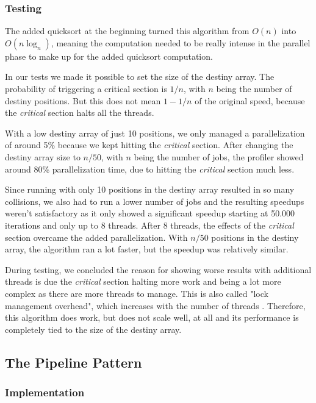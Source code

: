 \documentclass[9pt,journal]{IEEEtran}
\begin{document}
\subsubsection{Testing}

The added quicksort at the beginning turned this algorithm from $ O(n) $ into $ O(n\log_n) $, meaning the computation needed to be really intense in the parallel phase to make up for the added quicksort computation. 

In our tests we made it possible to set the size of the destiny array. The probability of triggering a critical section is $ 1 / n $, with $ n $ being the number of destiny positions. But this does not mean $ 1 - 1 / n $ of the original speed, because the \textit{critical} section halts all the threads. 

With a low destiny array of just 10 positions, we only managed a parallelization of around 5\% because we kept hitting the \textit{critical} section. After changing the destiny array size to $ n / 50 $, with $ n $ being the number of jobs, the profiler showed around 80\% parallelization time, due to hitting the \textit{critical} section much less.

Since running with only 10 positions in the destiny array resulted in so many collisions, we also had to run a lower number of jobs and the resulting speedups weren't satisfactory as it only showed a significant speedup starting at 50.000 iterations and only up to 8 threads. After 8 threads, the effects of the \textit{critical} section overcame the added parallelization. With $ n / 50 $ positions in the destiny array, the algorithm ran a lot faster, but the speedup was relatively similar. 

During testing, we concluded the reason for showing worse results with additional threads is due the \textit{critical} section halting more work and being a lot more complex as there are more threads to manage. This is also called "lock management overhead", which increases with the number of threads \cite{lockmanage}. Therefore, this algorithm does work, but does not scale well, at all and its performance is completely tied to the size of the destiny array.

\subsection{The Pipeline Pattern}
\subsubsection{Implementation}
\end{document}
